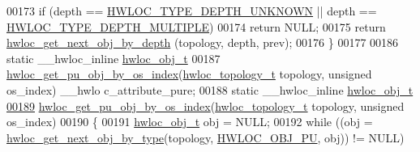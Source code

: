 \begin{DoxyCode}
{{00173   \textcolor{keywordflow}{if} (depth == \hyperlink{a00046_ggaf4e663cf42bbe20756b849c6293ef575a0565ab92ab72cb0cec91e23003294aad}{HWLOC_TYPE_DEPTH_UNKNOWN} || depth == \hyperlink{a00046_ggaf4e663cf42bbe20756b849c6293ef575ae99465995cacde6c210d5fc2e409798c}{HWLOC_TYPE_DEPTH_MULTIPLE})
00174     \textcolor{keywordflow}{return} NULL;
00175   \textcolor{keywordflow}{return} \hyperlink{a00053_gab7c1dce3f42ece5bfa621e87cf332418}{hwloc_get_next_obj_by_depth} (topology, depth, prev);
00176 \}
00177 
00186 \textcolor{keyword}{static} \_\_hwloc\_inline \hyperlink{a00016}{hwloc_obj_t}
00187 \hyperlink{a00053_ga0bc54225b65d557c70c7cb5dfb714de7}{hwloc_get_pu_obj_by_os_index}(\hyperlink{a00039_ga9d1e76ee15a7dee158b786c30b6a6e38}{hwloc_topology_t} topology, \textcolor{keywordtype}{unsigned} os\_index) \_\_hwlo
      c\_attribute\_pure;
00188 \textcolor{keyword}{static} \_\_hwloc\_inline \hyperlink{a00016}{hwloc_obj_t}
\hypertarget{a00031_source_l00189}{}\hyperlink{a00053_ga0bc54225b65d557c70c7cb5dfb714de7}{00189} \hyperlink{a00053_ga0bc54225b65d557c70c7cb5dfb714de7}{hwloc_get_pu_obj_by_os_index}(\hyperlink{a00039_ga9d1e76ee15a7dee158b786c30b6a6e38}{hwloc_topology_t} topology, \textcolor{keywordtype}{unsigned} os\_index)
00190 \{
00191   \hyperlink{a00016}{hwloc_obj_t} obj = NULL;
00192   \textcolor{keywordflow}{while} ((obj = \hyperlink{a00053_ga5f08ceb69375341e73563cfe2e77534e}{hwloc_get_next_obj_by_type}(topology, \hyperlink{a00041_ggacd37bb612667dc437d66bfb175a8dc55abca6887e80cb291353b0a0c1da83f661}{HWLOC_OBJ_PU}, obj)) != NULL)
      
}}
\end{DoxyCode}
